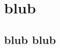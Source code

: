 \documentclass{article}
\begin{document}
\tableofcontents

\section{blub}
\subsection{blub blub}
\end{document}
